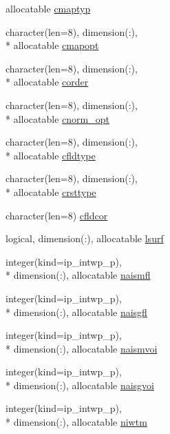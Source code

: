 \begin{DoxyCompactItemize}
allocatable \hyperlink{classmod__oasis__namcouple_a82b32aa4c78713443daf65a3dfbc75dc}{cmaptyp}
\item 
character(len=8), dimension(\+:), \\*
allocatable \hyperlink{classmod__oasis__namcouple_a3d7b34ed13d4ad8f86bbab3ad9956b6b}{cmapopt}
\item 
character(len=8), dimension(\+:), \\*
allocatable \hyperlink{classmod__oasis__namcouple_a070f65b97986d1075f1deed9224cd89b}{corder}
\item 
character(len=8), dimension(\+:), \\*
allocatable \hyperlink{classmod__oasis__namcouple_a205e8ba5863c6bf6de5c8450fb060c7a}{cnorm\+\_\+opt}
\item 
character(len=8), dimension(\+:), \\*
allocatable \hyperlink{classmod__oasis__namcouple_af6d77b87036aa40faa1ae1ed1b2a0866}{cfldtype}
\item 
character(len=8), dimension(\+:), \\*
allocatable \hyperlink{classmod__oasis__namcouple_a7cbf27327f01748c4f87803ccff71b61}{crsttype}
\item 
character(len=8) \hyperlink{classmod__oasis__namcouple_a5e1d0d9b3d9f438102623d9643fbc704}{cfldcor}
\item 
logical, dimension(\+:), allocatable \hyperlink{classmod__oasis__namcouple_a902fe007f6c2505858bf72dbc64e43a2}{lsurf}
\item 
integer(kind=ip\+\_\+intwp\+\_\+p), \\*
dimension(\+:), allocatable \hyperlink{classmod__oasis__namcouple_a4a7cad8814c7811b364fd7d70b60b576}{naismfl}
\item 
integer(kind=ip\+\_\+intwp\+\_\+p), \\*
dimension(\+:), allocatable \hyperlink{classmod__oasis__namcouple_ada0ad7614eba9cc3a1e168484a520c33}{naisgfl}
\item 
integer(kind=ip\+\_\+intwp\+\_\+p), \\*
dimension(\+:), allocatable \hyperlink{classmod__oasis__namcouple_ae3d7c72b2f2f3ece9583cc0b25edbaba}{naismvoi}
\item 
integer(kind=ip\+\_\+intwp\+\_\+p), \\*
dimension(\+:), allocatable \hyperlink{classmod__oasis__namcouple_a87c0bb7c0a2cccbb673dcaf35e3dec50}{naisgvoi}
\item 
integer(kind=ip\+\_\+intwp\+\_\+p), \\*
dimension(\+:), allocatable \hyperlink{classmod__oasis__namcouple_a90e4ce86f77bf89c71a9277ff9b5dcbb}{niwtm}

\end{DoxyCompactItemize}
